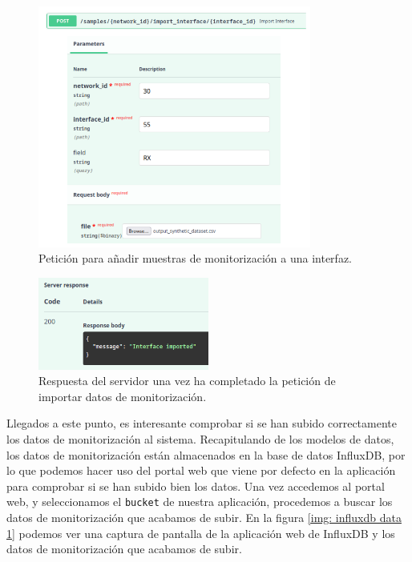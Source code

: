 \documentclass[a4paper, oneside, 12pt]{book}
\begin{document}
	\begin{figure}[h!]
		\begin{center}
			\includegraphics[width=0.8\textwidth]{diag/request_import_if.png}
			\caption{Petición para añadir muestras de monitorización a una interfaz.}
			\label{img: request import if (validate)}
		\end{center}
	\end{figure}
	
	\pagebreak
	
	\begin{figure}[h!]
		\begin{center}
			\includegraphics[width=0.5\textwidth]{img/response_import_if.png}
			\caption{Respuesta del servidor una vez ha completado la petición de importar datos de monitorización.}
			\label{img: response import if (validate)}
		\end{center}
	\end{figure}

	\noindent Llegados a este punto, es interesante comprobar si se han subido correctamente los datos de monitorización al sistema. Recapitulando de los modelos de datos, los datos de monitorización están almacenados en la base de datos InfluxDB, por lo que podemos hacer uso del portal web que viene por defecto en la aplicación para comprobar si se han subido bien los datos. Una vez accedemos al portal web, y seleccionamos el \texttt{bucket} de nuestra aplicación, procedemos a buscar los datos de monitorización que acabamos de subir. En la figura \ref{img: influxdb data 1} podemos ver una captura de pantalla de la aplicación web de InfluxDB y los datos de monitorización que acabamos de subir.
	
\end{document}
